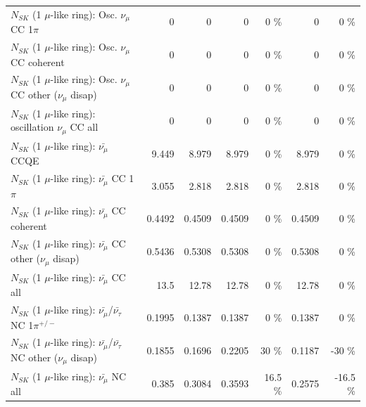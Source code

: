 \begin{table}
\begin{tabular}{| l | r | r | r  r | r  r |}
                          $N_{SK}$ (1 $\mu$-like ring): Osc. $\nu_\mu$ CC 1$\pi$ &               0 &               0 &               0 &        0 \%  &               0 &        0 \%  \\ 
                        $N_{SK}$ (1 $\mu$-like ring): Osc. $\nu_\mu$ CC coherent &               0 &               0 &               0 &        0 \%  &               0 &        0 \%  \\ 
         $N_{SK}$ (1 $\mu$-like ring): Osc. $\nu_\mu$ CC other ($\nu_\mu$ disap) &               0 &               0 &               0 &        0 \%  &               0 &        0 \%  \\ 
                      $N_{SK}$ (1 $\mu$-like ring): oscillation $\nu_\mu$ CC all &               0 &               0 &               0 &        0 \%  &               0 &        0 \%  \\ 
\hline
\hline
                              $N_{SK}$ (1 $\mu$-like ring): $\bar{\nu_\mu}$ CCQE &           9.449 &           8.979 &           8.979 &        0 \%  &           8.979 &        0 \%  \\ 
                         $N_{SK}$ (1 $\mu$-like ring): $\bar{\nu_\mu}$ CC 1$\pi$ &           3.055 &           2.818 &           2.818 &        0 \%  &           2.818 &        0 \%  \\ 
                       $N_{SK}$ (1 $\mu$-like ring): $\bar{\nu_\mu}$ CC coherent &          0.4492 &          0.4509 &          0.4509 &        0 \%  &          0.4509 &        0 \%  \\ 
        $N_{SK}$ (1 $\mu$-like ring): $\bar{\nu_\mu}$ CC other ($\nu_\mu$ disap) &          0.5436 &          0.5308 &          0.5308 &        0 \%  &          0.5308 &        0 \%  \\ 
                          $N_{SK}$ (1 $\mu$-like ring): $\bar{\nu_{\mu}}$ CC all &            13.5 &           12.78 &           12.78 &        0 \%  &           12.78 &        0 \%  \\ 
\hline
  $N_{SK}$ (1 $\mu$-like ring): $\bar{\nu_\mu}$/$\bar{\nu_\tau}$ NC 1$\pi^{+/-}$ &          0.1995 &          0.1387 &          0.1387 &        0 \%  &          0.1387 &        0 \%  \\ 
$N_{SK}$ (1 $\mu$-like ring): $\bar{\nu_\mu}$/$\bar{\nu_\tau}$ NC other ($\nu_\mu$ disap) &          0.1855 &          0.1696 &          0.2205 &       30 \%  &          0.1187 &      -30 \%  \\ 
                          $N_{SK}$ (1 $\mu$-like ring): $\bar{\nu_{\mu}}$ NC all &           0.385 &          0.3084 &          0.3593 &     16.5 \%  &          0.2575 &    -16.5 \%  \\ 

\end{tabular}
\end{table}
